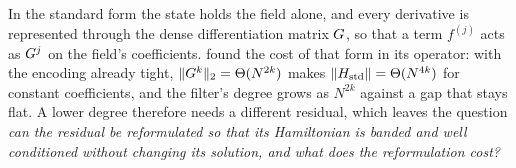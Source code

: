 %

In the standard form the state holds the field alone, and every derivative is represented through the dense differentiation matrix $G$, so that a term $f^{(j)}$ acts as $G^j$ on the field's coefficients.  found the cost of that form in its operator: with the encoding already tight, $\|G^k\|_2=\Theta(N^{2k})$ makes $\|H_{\mathrm{std}}\|=\Theta(N^{4k})$ for constant coefficients, and the filter's degree grows as $N^{2k}$ against a gap that stays flat. A lower degree therefore needs a different residual, which leaves the question \emph{can the residual be reformulated so that its Hamiltonian is banded and well conditioned without changing its solution, and what does the reformulation cost?}

